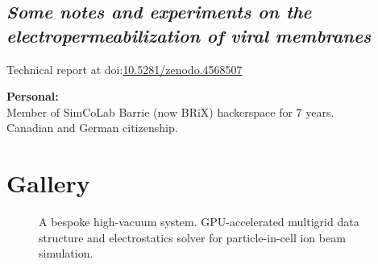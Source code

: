 \documentclass[fleqn,11pt]{article}
\begin{document}
{\begin{multicols}{1}
\subsection*{\textit{Some notes and experiments on the electropermeabilization of viral membranes}}

Technical report at doi:\href{https://doi.org/10.5281/zenodo.4568507}{10.5281/zenodo.4568507}



	
%


%
\begin{tcolorbox}
	\textbf{Personal:\\}
	Member of SimCoLab Barrie (now BRiX) hackerspace for 7 years.\\
	Canadian and German citizenship.
\end{tcolorbox}
%



\end{multicols}


\section{Gallery}
\begin{figure}[H]
	\centering
	\caption*{A bespoke high-vacuum system. GPU-accelerated multigrid data structure and electrostatics solver for particle-in-cell ion beam simulation.}
	\hfill
	

\end{figure}}
\end{document}
